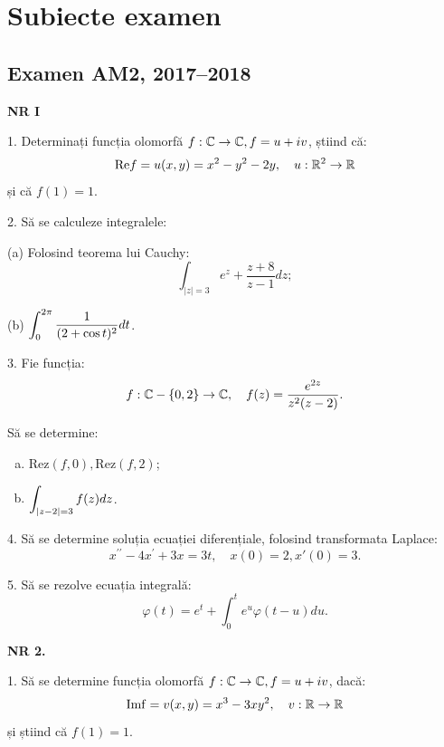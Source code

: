 \chapter{Subiecte examen}

\section{Examen AM2, 2017--2018}

\textbf{NR I}

1. Determinați funcția olomorfă $ f : \mathbb{C} \to \mathbb{C}, f = u + iv$, știind că:
\[
  \mathrm{Re}f = u(x, y) = x^2 - y^2 - 2y, \quad u : \mathbb{R}^2 \to \mathbb{R}
\]
și că $ f(1) = 1 $.

\vspace{1cm}

2. Să se calculeze integralele:

(a) Folosind teorema lui Cauchy:
\[
  \int_{|z| = 3} e^z + \frac{z + 8}{z-1} dz;
\]

(b) $ \displaystyle\int_0^{2\pi} \frac{1}{(2 + \cos t)^2} dt $.

\vspace{1cm}

3. Fie funcția:
\[
  f : \mathbb{C} - \{0, 2\} \to \mathbb{C}, \quad f(z) = \frac{e^{2z}}{z^2(z - 2)}.
\]

Să se determine:
\begin{enumerate}[(a)]
\item $ \mathrm{Rez}(f, 0), \mathrm{Rez}(f, 2) $;
\item $ \displaystyle\int_{|z - 2| = 3} f(z) dz $.
\end{enumerate}

\vspace{1cm}

4. Să se determine soluția ecuației diferențiale, folosind transformata Laplace:
\[
  x^{\prime\prime} - 4x^\prime + 3x = 3t, \quad x(0) = 2, x'(0) = 3.
\]

\vspace{1cm}

5. Să se rezolve ecuația integrală:
\[
  \varphi(t) = e^t + \int_0^t e^u \varphi(t - u) du.
\]

\vspace{2cm}

\textbf{NR 2.}

1. Să se determine funcția olomorfă $ f : \mathbb{C} \to \mathbb{C}, f = u + iv$, dacă:
\[
  \mathrm{Imf} = v(x, y) = x^3 - 3xy^2, \quad v : \mathbb{R} \to \mathbb{R}
\]
și știind că $ f(1) = 1 $.

\vspace{1cm}

